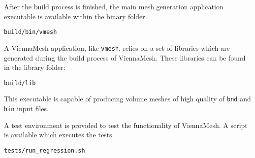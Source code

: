 
After the build process is finished, the main mesh generation application 
executable is available within the binary folder. 
\begin{exaipd}
\begin{Verbatim}
build/bin/vmesh
\end{Verbatim}
\end{exaipd}

A ViennaMesh application, like \texttt{vmesh}, relies on a set of libraries 
which are generated during the build process of ViennaMesh. These libraries
can be found in the library folder:
\begin{exaipd}
\begin{Verbatim}
build/lib
\end{Verbatim}
\end{exaipd}

This executable is capable of producing volume meshes of high quality of 
\texttt{bnd} and \texttt{hin} input files. 


A test environment is provided to test the functionality of ViennaMesh. 
A script is available which executes the tests.
\begin{exaipd}
\begin{Verbatim}
tests/run_regression.sh
\end{Verbatim}
\end{exaipd}

